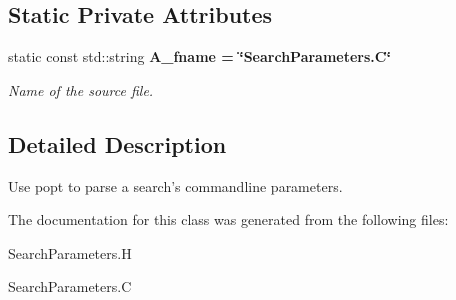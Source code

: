 \subsection*{Static Private Attributes}
\begin{CompactItemize}
\item 
static const std::string \bf{A\_\-fname} = \char`\"{}Search\-Parameters.C\char`\"{}\label{classASCbase_1_1SearchParameters_865031ac44a12f4833a96bf17e718b2c}

\begin{CompactList}\small\item\em Name of the source file. \item\end{CompactList}\end{CompactItemize}


\subsection{Detailed Description}
Use popt to parse a search's commandline parameters. 



The documentation for this class was generated from the following files:\begin{CompactItemize}
\item 
Search\-Parameters.H\item 
Search\-Parameters.C\end{CompactItemize}

